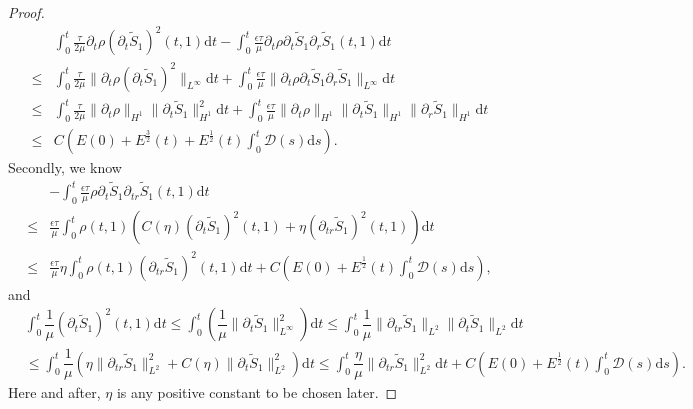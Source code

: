 \documentclass[10pt,a4paper]{amsart}
\begin{document}
\begin{proof}
\begin{equation}
\begin{aligned}
				&\int_{0}^{t}\frac{\tau}{2\mu}\partial_{t}\rho(\partial_{t}\tilde{S}_1)^2(t,1)\mathrm{d}t
				-\int_{0}^{t}\frac{\epsilon\tau}{\mu}\partial_{t}\rho\partial_{t}\tilde{S}_1\partial_{r}\tilde{S}_1(t,1)\mathrm{d}t
				\\
				\leq&\int_{0}^{t}\frac{\tau}{2\mu}\|\partial_{t}\rho(\partial_{t}\tilde{S}_1)^2\|_{L^\infty}\mathrm{d}t
				+\int_{0}^{t}\frac{\epsilon\tau}{\mu}\|\partial_{t}\rho\partial_{t}\tilde{S}_1\partial_{r}\tilde{S}_1\|_{L^\infty}\mathrm{d}t\\
				\leq&\int_{0}^{t}\frac{\tau}{2\mu}\|\partial_{t}\rho\|_{H^1}\|\partial_{t}\tilde{S}_1\|_{H^1}^2\mathrm{d}t
				+\int_{0}^{t}\frac{\epsilon\tau}{\mu}\|\partial_{t}\rho\|_{H^1}\|\partial_{t}\tilde{S}_1\|_{H^1}\|\partial_{r}\tilde{S}_1\|_{H^1}\mathrm{d}t\\
				\leq&C\left(E(0)+E^{\frac{3}{2}}(t)+E^{\frac{1}{2}}(t) \int_{0}^t \mathcal{D}(s)\mathrm{d}s\right).
			\end{aligned}
		\end{equation}
		Secondly, we know
		\begin{equation}\nonumber
			\begin{aligned}
				&-\int_{0}^{t}\frac{\epsilon\tau}{\mu}\rho\partial_{t}\tilde{S}_1\partial_{tr}\tilde{S}_1(t,1)\mathrm{d}t\\
				\leq&\frac{\epsilon\tau}{\mu}\int_{0}^{t}\rho(t,1) \left(C(\eta)(\partial_{t}\tilde{S}_1)^2(t,1)+\eta(\partial_{tr}\tilde{S}_1)^2(t,1)\right)\mathrm{d}t\\
				\leq&\frac{\epsilon\tau}{\mu}\eta\int_{0}^{t}\rho(t,1)(\partial_{tr}\tilde{S}_1)^2(t,1)\mathrm{d}t
				+C\left(E(0)+E^{\frac{1}{2}}(t) \int_{0}^t \mathcal{D}(s)\mathrm{d}s\right),
			\end{aligned}
		\end{equation}
		and
		\begin{equation}
			\begin{aligned}\nonumber
				&\int_{0}^{t}\dfrac{1}{\mu} (\partial_{t}\tilde{S}_1)^2(t,1)\mathrm{d}t
				\leq \int_{0}^{t}(\dfrac{1}{\mu}\|\partial_{t}\tilde{S}_1\|_{L^\infty}^2)\mathrm{d}t
				\leq \int_{0}^{t}\dfrac{1}{\mu}\|\partial_{tr}\tilde{S}_1\|_{L^2}\|\partial_{t}\tilde{S}_1\|_{L^2}\mathrm{d}t\\
				&\leq \int_{0}^{t}\dfrac{1}{\mu} (\eta\|\partial_{tr}\tilde{S}_1\|_{L^2}^2+C(\eta)\|\partial_{t}\tilde{S}_1\|_{L^2}^2)\mathrm{d}t
				\leq \int_{0}^{t}\dfrac{\eta}{\mu}\|\partial_{tr}\tilde{S}_1\|_{L^2}^2\mathrm{d}t+C\left(E(0)+E^{\frac{1}{2}}(t) \int_{0}^t \mathcal{D}(s)\mathrm{d}s\right).
			\end{aligned}
		\end{equation}
		Here and after, $\eta$ is any positive constant to be chosen later.


\end{proof}
\end{document}
